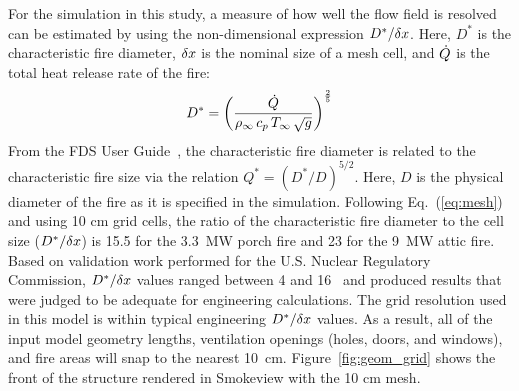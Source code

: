 \documentclass[12pt,oneside]{book}
\begin{document}
For the simulation in this study, a measure of how well the flow field is resolved can be estimated by using the non-dimensional expression $D^*/\delta x$. Here, $D^*$ is the characteristic fire diameter, $\delta x$ is the nominal size of a mesh cell, and $\dot{Q}$ is the total heat release rate of the fire:
\begin{equation}
D^* = \left(
     \frac{\dot{Q}}{\rho_\infty \, c_p \, T_\infty \, \sqrt{g} }
     \right)^\frac{2}{5} 
\label{eq:mesh}
\end{equation}   
From the FDS User Guide~\cite{FDS_Users_Guide}, the characteristic fire diameter is related to the characteristic fire size via the
relation $Q^* = (D^*/D)^{5/2}$. Here, $D$ is the physical diameter of the fire as it is specified in the simulation. Following Eq.~(\ref{eq:mesh}) and using 10 cm grid cells, the ratio of the characteristic fire diameter to the cell size ($D^*/\delta x$) is 15.5 for the 3.3~MW porch fire and 23 for the 9~MW attic fire. Based on validation work performed for the U.S. Nuclear Regulatory Commission, $D^*/\delta x$ values ranged between 4 and 16~\cite{NUREG_1824} and produced results that were judged to be adequate for engineering calculations. The grid resolution used in this model is within typical engineering $D^*/\delta x$ values. As a result, all of the input model geometry lengths, ventilation openings (holes, doors, and windows), and fire areas will snap to the nearest 10~cm. Figure~\ref{fig:geom_grid} shows the front of the structure rendered in Smokeview with the 10 cm mesh.
\end{document}
